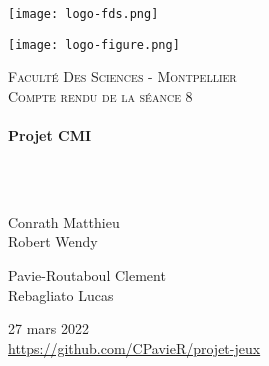 \documentclass[a4paper, 12pt]{article}
\begin{document}
\begin{titlepage}
  \begin{sffamily}
  \begin{center}
  

\begin{minipage}[c]{.46\linewidth}
     \begin{center}
             \texttt{[image: logo-fds.png]}
         \end{center}
   \end{minipage} \hfill
   \begin{minipage}[c]{.46\linewidth}
    \begin{center}
            \texttt{[image: logo-figure.png]}
        \end{center}
 \end{minipage}
    \newline \newline

    \textsc{\LARGE Faculté Des Sciences - Montpellier}\\[2cm]

    \textsc{\Large Compte rendu de la séance 8}\\[1.5cm]

    \HRule \\[0.4cm]
    { \huge \bfseries Projet CMI\\[0.4cm] }

    \HRule \\[2cm]
    \\[2cm]

    \begin{minipage}{0.4\textwidth}
      \begin{flushleft} \large
        Conrath Matthieu\\
        Robert Wendy\\
      \end{flushleft}
    \end{minipage}
    \begin{minipage}{0.4\textwidth}
      \begin{flushright} \large
       Pavie-Routaboul Clement\\
        Rebagliato Lucas\\
      \end{flushright}
    \end{minipage}

    \vfill
    {\large 27 mars 2022}
    \\
    {\url{https://github.com/CPavieR/projet-jeux}}

  \end{center}
  \end{sffamily}
\end{titlepage}
\end{document}
